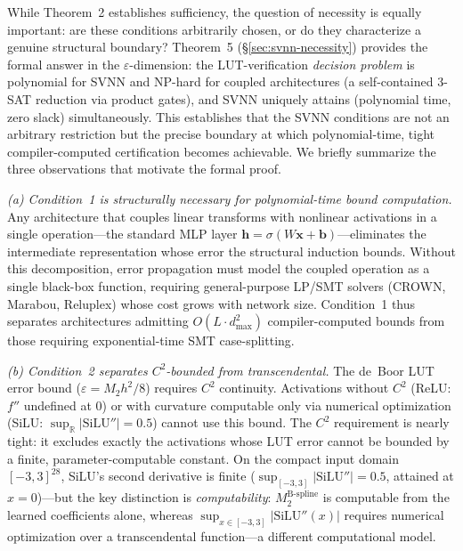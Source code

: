 \vspace{4pt}
\begin{remark}
\label{rem:near_necessity}
While Theorem~2 establishes sufficiency, the question of necessity is
equally important: are these conditions arbitrarily chosen, or do they
characterize a genuine structural boundary? Theorem~5
({\S}\ref{sec:svnn-necessity}) provides the formal answer in the
$\varepsilon$-dimension: the LUT-verification \emph{decision problem}
is polynomial for SVNN and NP-hard for coupled architectures (a
self-contained 3-SAT reduction via product gates), and SVNN uniquely
attains (polynomial time, zero slack) simultaneously. This establishes
that the SVNN conditions are not an arbitrary restriction but the
precise boundary at which polynomial-time, tight compiler-computed
certification becomes achievable. We briefly summarize the three
observations that motivate the formal proof.

\vspace{2pt}
\noindent\textit{(a) Condition~1 is structurally necessary for polynomial-time
bound computation.}
Any architecture that couples linear transforms with nonlinear activations
in a single operation---the standard MLP layer $\mathbf{h} = \sigma(W\mathbf{x}
+ \mathbf{b})$---eliminates the intermediate representation whose error the
structural induction bounds. Without this decomposition, error propagation
must model the coupled operation as a single black-box function, requiring
general-purpose LP/SMT solvers (CROWN, Marabou, Reluplex) whose cost grows
with network size. Condition~1 thus separates architectures admitting $O(L
\cdot d_{\max}^2)$ compiler-computed bounds from those requiring
exponential-time SMT case-splitting.

\vspace{2pt}
\noindent\textit{(b) Condition~2 separates $C^2$-bounded from transcendental.}
The de~Boor LUT error bound ($\varepsilon = M_2 h^2/8$) requires $C^2$
continuity. Activations without $C^2$ (ReLU: $f''$ undefined at 0) or with
curvature computable only via numerical optimization (SiLU: $\sup_{\mathbb{R}}|\text{SiLU}''| = 0.5$)
cannot use this bound. The $C^2$ requirement is nearly tight: it excludes
exactly the activations whose LUT error cannot be bounded by a finite,
parameter-computable constant. On the compact input domain $[-3,3]^{28}$,
SiLU's second derivative is finite ($\sup_{[-3,3]}|\text{SiLU}''| = 0.5$,
attained at $x=0$)---but the key
distinction is \textit{computability}: $M_2^{\text{B-spline}}$ is computable
from the learned coefficients alone, whereas $\sup_{x\in[-3,3]}
|\text{SiLU}''(x)|$ requires numerical optimization over a transcendental
function---a different computational model.


\end{remark}
